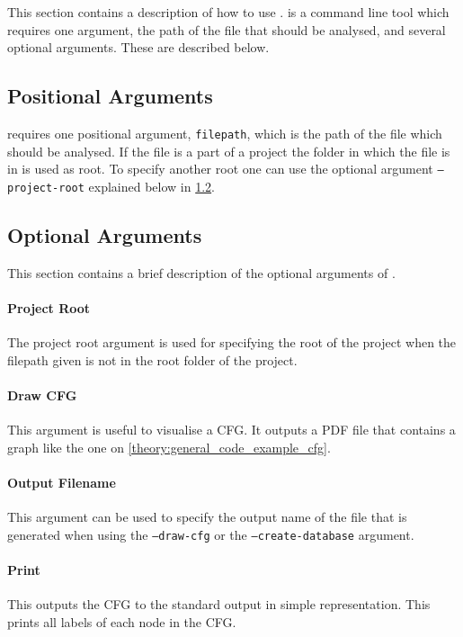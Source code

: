 \section{\pyt}
This section contains a description of how to use \pyt{}.
\pyt{} is a command line tool which requires one argument, the path of the file that should be analysed, and several optional arguments.
These are described below.

\subsection{Positional Arguments}
\pyt{} requires one positional argument, \texttt{filepath}, which is the path of the file which should be analysed.
If the file is a part of a project the folder in which the file is in is used as root.
To specify another root one can use the optional argument \texttt{--project-root} explained below in \cref{pyt:optional}.

\subsection{Optional Arguments}\label{pyt:optional}
This section contains a brief description of the optional arguments of \pyt{}.

\paragraph{Project Root}
The project root argument is used for specifying the root of the project when the filepath given is not in the root folder of the project.

\paragraph{Draw CFG}
This argument is useful to visualise a CFG.
It outputs a PDF file that contains a graph like the one on \cref{theory:general_code_example_cfg}.

\paragraph{Output Filename}
This argument can be used to specify the output name of the file that is generated when using the \texttt{--draw-cfg} or the \texttt{--create-database} argument.

\paragraph{Print}
This outputs the CFG to the standard output in simple representation.
This prints all labels of each node in the CFG.

